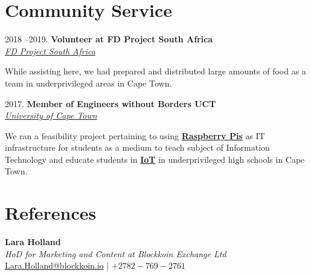 \documentclass[10pt,a4paper,ragged2e,withhyper]{altacv}
\newcommand{\myhref}[2]{
		\href{#1}
		{\textcolor{ColorTwo}{#2}}
	}
\begin{document}
\begin{adjustbox}{valign=t}
\begin{minipage}{0.6\textwidth}
            \vspace{-10mm}\section*{Community Service}
            
                 \item[\normalfont \textcolor{ColorOne}{2018 --2019.}] 
                    	\textbf{Volunteer at FD Project South Africa}\\ \medskip 
                    	\textit{\myhref{https://mobile.twitter.com/fdprojectsa}{FD Project South Africa}     }\\ 
                    	\begin{description}
                            While assisting here, we had prepared and distributed large amounts of food as a team in underprivileged areas in Cape Town. 
                        \end{description}
                    \item[\normalfont \textcolor{ColorOne}{2017.}] 
                    	\textbf{Member of Engineers without Borders UCT}\\ \medskip 
                    	\textit{\myhref{https://https://www.facebook.com/EWBUCT/}{University of Cape Town}}\\ 
                    	\begin{description}
                            We ran a feasibility project pertaining to using \underline{\textbf{Raspberry Pis}} as IT infrastructure for students as a medium to teach subject of Information  Technology and educate students in \underline{\textbf{IoT}} in underprivileged high schools in  Cape Town.
                        \end{description}
            \vspace{-5mm}\section*{References}
                \begin{description} 
                    \item
                    	\textbf{Lara Holland} \\
                       \textcolor{ColorTwo}{\textit{HoD for Marketing and Content at Blockkoin Exchange Ltd}}\\ 
                	    \url{Lara.Holland@blockkoin.io} | $+2782-769-2761$ 
                    \item

\end{description}
\end{minipage}
\end{adjustbox}
\end{document}
